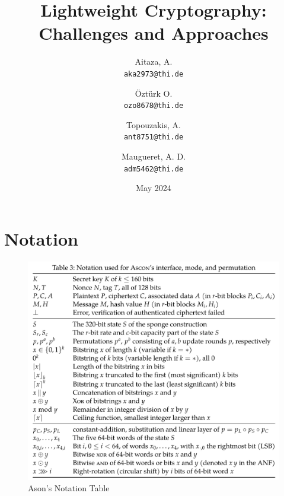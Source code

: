 \documentclass{article}
\date{May 2024}
\title{Lightweight Cryptography: Challenges and Approaches}
\author{
  Aitaza, A. \\
  \texttt{aka2973@thi.de}
  \and
  Öztürk O.\\
  \texttt{ozo8678@thi.de}   
  \and
  Topouzakis, A. \\
  \texttt{ant8751@thi.de}
  \and
  Maugueret, A. D.\\
  \texttt{adm5462@thi.de}
  }
\begin{document}
\maketitle

\newpage
\tableofcontents
\listoffigures
\newpage

\section{Notation}

\begin{figure}[H] 
    \centering 
    \includegraphics[width=1\textwidth]{figures/ascon-notation.png}
    \caption{Ason's Notation Table \cite{Ascon-v1.2}}
    \label{fig:ascon-notation} 
  \end{figure}








\newpage
\printbibliography
\end{document}
